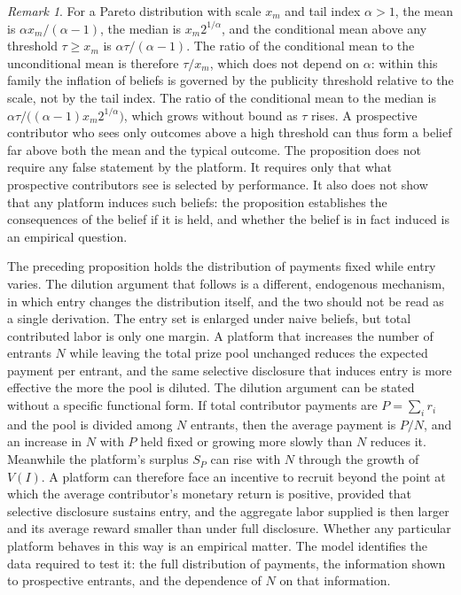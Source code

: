\documentclass[11pt]{article}
\theoremstyle{remark}
\newtheorem{remark}{Remark}
\begin{document}
\begin{remark}
For a Pareto distribution with scale $x_m$ and tail index $\alpha>1$, the mean is $\alpha x_m/(\alpha-1)$, the median is $x_m 2^{1/\alpha}$, and the conditional mean above any threshold $\tau \ge x_m$ is $\alpha \tau/(\alpha-1)$. The ratio of the conditional mean to the unconditional mean is therefore $\tau/x_m$, which does not depend on $\alpha$: within this family the inflation of beliefs is governed by the publicity threshold relative to the scale, not by the tail index. The ratio of the conditional mean to the median is $\alpha\tau/\bigl((\alpha-1)x_m2^{1/\alpha}\bigr)$, which grows without bound as $\tau$ rises. A prospective contributor who sees only outcomes above a high threshold can thus form a belief far above both the mean and the typical outcome. The proposition does not require any false statement by the platform. It requires only that what prospective contributors see is selected by performance. It also does not show that any platform induces such beliefs: the proposition establishes the consequences of the belief if it is held, and whether the belief is in fact induced is an empirical question.
\end{remark}

The preceding proposition holds the distribution of payments fixed while entry varies. The dilution argument that follows is a different, endogenous mechanism, in which entry changes the distribution itself, and the two should not be read as a single derivation. The entry set is enlarged under naive beliefs, but total contributed labor is only one margin. A platform that increases the number of entrants $N$ while leaving the total prize pool unchanged reduces the expected payment per entrant, and the same selective disclosure that induces entry is more effective the more the pool is diluted. The dilution argument can be stated without a specific functional form. If total contributor payments are $P = \sum_i r_i$ and the pool is divided among $N$ entrants, then the average payment is $P/N$, and an increase in $N$ with $P$ held fixed or growing more slowly than $N$ reduces it. Meanwhile the platform's surplus $S_P$ can rise with $N$ through the growth of $V(I)$. A platform can therefore face an incentive to recruit beyond the point at which the average contributor's monetary return is positive, provided that selective disclosure sustains entry, and the aggregate labor supplied is then larger and its average reward smaller than under full disclosure. Whether any particular platform behaves in this way is an empirical matter. The model identifies the data required to test it: the full distribution of payments, the information shown to prospective entrants, and the dependence of $N$ on that information.
\end{document}
